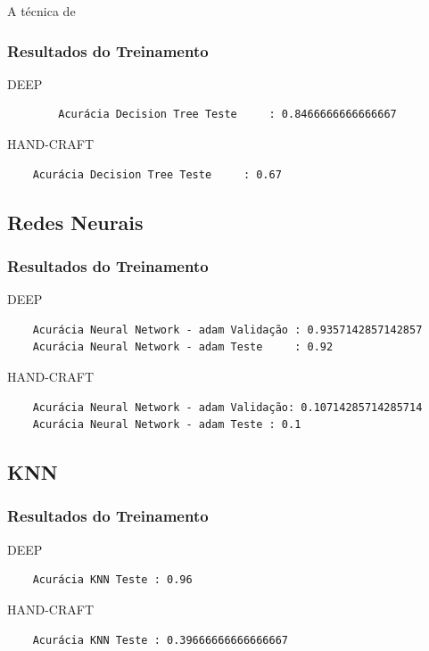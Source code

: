 \documentclass[
article,			%
11pt,				%
oneside,			%
a4paper,			%
english,			%
brazil,				%
sumario=tradicional,
]{abntex2}
\begin{document}
	A técnica de
	
	\subsubsection{Resultados do Treinamento}
	DEEP
	\begin{verbatim}
		Acurácia Decision Tree Teste     : 0.8466666666666667
	\end{verbatim}
	
	HAND-CRAFT
	\begin{verbatim}
	Acurácia Decision Tree Teste     : 0.67
	\end{verbatim}
	
	\subsection{Redes Neurais}
	
	\subsubsection{Resultados do Treinamento}
	DEEP
	\begin{verbatim}
	Acurácia Neural Network - adam Validação : 0.9357142857142857
	Acurácia Neural Network - adam Teste     : 0.92
	\end{verbatim}
	
	HAND-CRAFT
	\begin{verbatim}
	Acurácia Neural Network - adam Validação: 0.10714285714285714
	Acurácia Neural Network - adam Teste : 0.1
	\end{verbatim}
	
	\subsection{KNN}
	
	\subsubsection{Resultados do Treinamento}
	
	DEEP	
	\begin{verbatim}
	Acurácia KNN Teste : 0.96
	\end{verbatim}
	
	HAND-CRAFT
	\begin{verbatim}
	Acurácia KNN Teste : 0.39666666666666667
	\end{verbatim}
	
	
\end{document}
